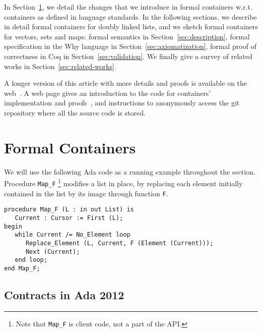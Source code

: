 \documentclass[runningheads,a4paper]{llncs}
\newcommand{\wrt}{w.r.t.\xspace}
\newcommand{\beforesec}{\vspace{-0.2cm}}
\newcommand{\aftersec}{\vspace{-0.2cm}}
\newcommand{\beforesub}{\vspace{-0.2cm}}
\newcommand{\aftersub}{\vspace{-0.1cm}}
\begin{document}
In Section~\ref{sec:formal-containers}, we detail the changes that we introduce
in formal containers \wrt containers as defined in language standards. In the following
sections, we describe in detail formal containers for doubly linked lists, and
we sketch formal containers for vectors, sets and maps: formal semantics in
Section~\ref{sec:description}, formal specification in the Why language in
Section~\ref{sec:axiomatization}, formal proof of correctness in Coq in
Section~\ref{sec:validation}. We finally give a survey of related works in
Section~\ref{sec:related-works}.

A longer version of this article with more details and proofs is available on
the web~\cite{dross:2011:fc-long}.  A web page gives an introduction to the
code for containers' implementation and proofs~\cite{dross:2011:fc-code}, and
instructions to anonymously access the git repository where all the source code
is stored.


\beforesec
\section{Formal Containers}
\label{sec:formal-containers}
\aftersec

We will use the following Ada code as a running example throughout the
section. Procedure \verb|Map_F|
\footnote{Note that \texttt{Map\_F} is client code, not a part of the API.}
%
modifies a list in place, by replacing each
element initially contained in the list by its image through function \verb|F|.
\lstset{language=Ada, basicstyle=\small\tt, keywordstyle=\normalfont\textbf}
\begin{lstlisting}
procedure Map_F (L : in out List) is
   Current : Cursor := First (L);
begin
   while Current /= No_Element loop
      Replace_Element (L, Current, F (Element (Current)));
      Next (Current);
   end loop;
end Map_F;
\end{lstlisting}

\beforesub
\subsection{Contracts in Ada 2012}
\aftersub
\end{document}
